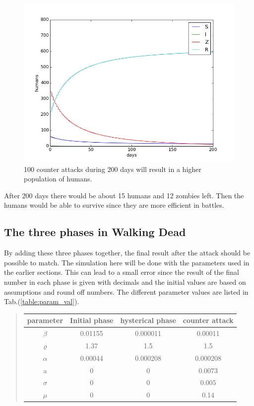 \documentclass[%
twoside,                 %
final,                   %
chapterprefix=true,      %
open=right               %
10pt]{book}
\begin{document}
\begin{figure}[ht]
  \centerline{\includegraphics[width=0.9\linewidth]{1_fig/WD_zombie_counter_series.png}}
  \caption{
  \label{fig:counter_series} 100 counter attacks during 200 days will result in a higher population of humans.
  }
\end{figure}


After 200 days there would be about 15 humans and 12 zombies left. Then the humans would be able to survive since they are more efficient in battles. 

\subsection{The three phases in Walking Dead}
By adding these three phases together, the final result after the attack should be possible to match. The simulation here will be done with the parameters used in the earlier sections. This can lead to a small error since the result of the final number in each phase is given with decimals and the initial values are based on assumptions and round off numbers. The different parameter values are listed in Tab.(\ref{table:param_val}). 

\label{table:param_val}

\begin{quote}
\begin{tabular}{cccc}
\hline
\multicolumn{1}{c}{ parameter } & \multicolumn{1}{c}{ Initial phase } & \multicolumn{1}{c}{ hysterical phase } & \multicolumn{1}{c}{ counter attack } \\
\hline
$\beta$   & 0.01155       & 0.000011         & 0.00011        \\
$\varrho$ & 1.37          & 1.5              & 1.5            \\
$\alpha$  & 0.00044       & 0.000208         & 0.000208       \\
a         & 0             & 0                & 0.0073         \\
$\sigma$  & 0             & 0                & 0.005          \\
$\mu$     & 0             & 0                & 0.14           \\
\hline
\end{tabular}
\end{quote}
\end{document}
